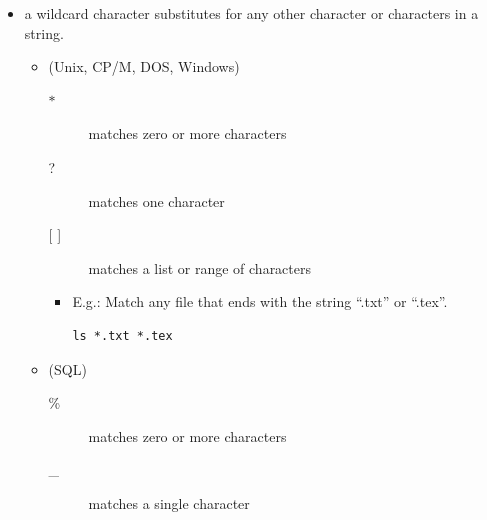 \documentclass[a4paper,landscape,headrule,footrule,dvips]{foils}
\begin{document}
\begin{CJK}{UTF8}{min}
\begin{itemize}
\end{itemize}

\MyLogo{}

\begin{itemize}
\item  a wildcard character  substitutes for any other character or characters in a string.
  \begin{itemize}
  \item {} (Unix, CP/M, DOS, Windows)
    \begin{description}
    \item[$*$] matches zero or more characters
    \item[?] matches one character
    \item[{[ ]}] matches a list or range of characters
    \end{description}
    \begin{itemize}
      \item E.g.:  Match any file that ends with the string ``.txt'' or ``.tex''.
\begin{verbatim}
ls *.txt *.tex
\end{verbatim}
     \end{itemize}
    \item {} (SQL)
    \begin{description}
    \item[\%]  matches zero or more characters
    \item[\_] matches a single character
    \end{description}
  \end{itemize}
\end{itemize}



\end{CJK}
\end{document}
